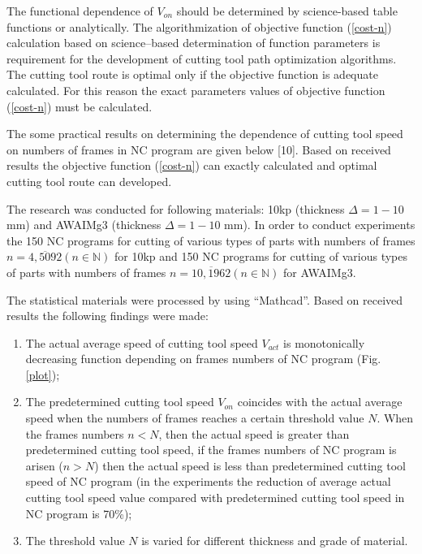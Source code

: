 \documentclass[runningheads]{llncs}
\begin{document}
The functional dependence of $V_{on}$
should be determined by science-based table functions or analytically.
The algorithmization of objective function (\ref{cost-n})
calculation based on science–based determination of function parameters
is requirement for the development of cutting tool path optimization algorithms.
The cutting tool route is optimal only if
the objective function is adequate calculated.
For this reason the exact parameters values of objective function (\ref{cost-n})
must be calculated.

The some practical results on determining
the dependence of cutting tool speed on numbers of frames in NC program
are given below [10].
Based on received results the objective function (\ref{cost-n})
can exactly calculated and optimal cutting tool route can developed.

The research was conducted for following materials:
10kp (thickness $\Delta=1-10$ mm) and
AWAIMg3 (thickness $\Delta=1-10$ mm).
In order to conduct experiments the 150 NC programs
for cutting of various types of parts with numbers of frames
$n=\overline{4, 5092}(n \in \mathbb{N})$
for 10kp
and 150 NC programs for cutting of various types of parts with numbers of frames
$n = \overline{10, 1962} (n \in \mathbb N)$
for AWAIMg3.

The statistical materials were processed by using ``Mathcad''.
Based on received results the following findings were made:

\begin{enumerate}
\item
The actual average speed of cutting tool speed $V_{act}$
is monotonically decreasing function depending on frames numbers of NC program
(Fig. \ref{plot});

\item
The predetermined cutting tool speed $V_{on}$
coincides with the actual average speed
when the numbers of frames reaches a certain threshold value $N$.
When the frames numbers $n < N$,
then the actual speed is greater than predetermined cutting tool speed,
if the frames numbers of NC program is arisen ($n>N$)
then the actual speed is less than
predetermined cutting tool speed of NC program
(in the experiments the reduction of average actual cutting tool speed value
compared with predetermined cutting tool speed in NC program is 70\%);

\item
The threshold value $N$ is varied for different thickness and grade of material.
\end{enumerate}
\end{document}
